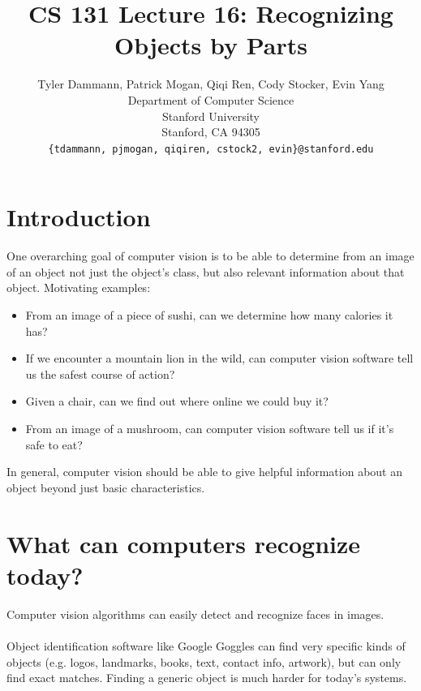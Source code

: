 \documentclass[11pt]{article}
\title{CS 131 Lecture 16: Recognizing Objects by Parts}
\author{
  Tyler Dammann, Patrick Mogan, Qiqi Ren, Cody Stocker, Evin Yang \\
  Department of Computer Science\\
  Stanford University\\
  Stanford, CA 94305 \\
  \texttt{\{tdammann, pjmogan, qiqiren, cstock2, evin\}@stanford.edu} \\
}
\begin{document}
\maketitle
\section{Introduction}
One overarching goal of computer vision is to be able to determine from an image of an object not just the object's class, but also relevant information about that object. Motivating examples:
 \begin{itemize}
   \item From an image of a piece of sushi, can we determine how many calories it has?
   \item If we encounter a mountain lion in the wild, can computer vision software tell us the safest course of action?
   \item Given a chair, can we find out where online we could buy it?
   \item From an image of a mushroom, can computer vision software tell us if it's safe to eat?
 \end{itemize}
In general, computer vision should be able to give helpful information about an object beyond just basic characteristics.
\section{What can computers recognize today?}
Computer vision algorithms can easily detect and recognize faces in images.\\ \\
Object identification software like Google Goggles can find very specific kinds of objects (e.g. logos, landmarks, books, text, contact info, artwork), but can only find exact matches. Finding a generic object is much harder for today's systems.
\end{document}
